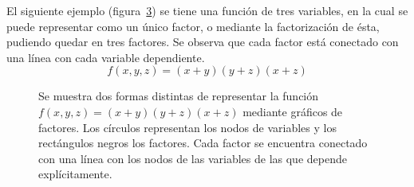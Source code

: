 \documentclass[11pt,twoside,spanish]{report} %
\begin{document}
El siguiente ejemplo (figura~\ref{graph:FGej1}) se tiene una funci\'on de tres variables, en la cual se puede representar como un \'unico factor, o mediante la factorizaci\'on de \'esta, pudiendo quedar en tres factores. 
Se observa que cada factor est\'a conectado con una l\'inea con cada variable dependiente.
	\begin{equation*}
	f(x,y,z) = (x+y)(y+z)(x+z)
	\end{equation*}
\begin{center}

	\begin{figure}[H]
		\centering
		\begin{subfigure}{.5\textwidth}
			\centering
			\caption{}
			\label{graph:FGej1-1}
		\end{subfigure}%
		\begin{subfigure}{.5\textwidth}
			\centering
			\caption{}
			\label{graph:FGej1-2}
		\end{subfigure}
		\caption{Se muestra dos formas distintas de representar la funci\'on $f(x,y,z) = (x+y)(y+z)(x+z)$ mediante gr\'aficos de factores. Los c\'irculos representan los nodos de variables y los rect\'angulos negros los factores. Cada factor se encuentra conectado con una l\'inea con los nodos de las variables de las que depende expl\'icitamente.}
		\label{graph:FGej1}
	\end{figure}
\end{center}
\end{document}
